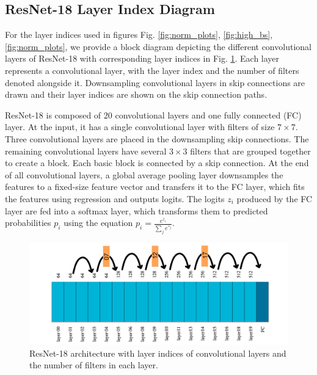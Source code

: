 \documentclass[runningheads]{llncs}
\begin{document}
\clearpage

\subsection{ResNet-18 Layer Index Diagram}
\label{sec:r18_layers}

For the layer indices used in figures Fig. \ref{fig:norm_plots}, \ref{fig:high_bs},
\ref{fig:norm_plots}, we provide a block diagram depicting the different convolutional
layers of ResNet-18 with corresponding layer indices in Fig. \ref{fig:resnet18}. Each
layer represents a convolutional layer, with the layer index and the number of filters
denoted alongside it. Downsampling convolutional layers in skip connections are drawn
and their layer indices are shown on the skip connection paths.


ResNet-18 is composed of $20$ convolutional layers and one fully connected (FC) layer.
At the input, it has a single convolutional layer with filters of size $7\times 7$.
Three convolutional layers are placed in the downsampling skip connections. The
remaining convolutional layers have several $3\times 3$ filters that are grouped
together to create a block. Each basic block is connected by a skip connection. At the
end of all convolutional layers, a global average pooling layer downsamples the features
to a fixed-size feature vector and transfers it to the FC layer, which fits the features
using regression and outputs logits. The logits $z_i$ produced by the FC layer are fed
into a softmax layer, which transforms them to predicted probabilities $p_i$ using the
equation $p_i=\frac {e^{z_i}}{\sum _j e^{z_j}}$.


\begin{figure}[ht] \centering \includegraphics[width=0.96\columnwidth]{drawing}
\caption{ ResNet-18 architecture with layer indices of convolutional layers and the
number of filters in each layer. } \label{fig:resnet18} \end{figure}
\end{document}
